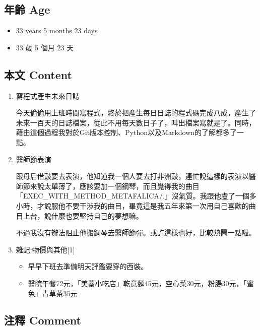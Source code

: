 \documentclass[a5paper, 12pt
]{book}
\providecommand{\tightlist}{%
  \setlength{\itemsep}{0pt}\setlength{\parskip}{0pt}}
\begin{document}
\hypertarget{ux5e74ux9f61-age-15}{%
\subsection{年齡 Age}\label{ux5e74ux9f61-age-15}}

\begin{itemize}
\tightlist
\item
  33 years 5 months 23 days
\item
  33 歲 5 個月 23 天
\end{itemize}

\hypertarget{ux672cux6587-content-15}{%
\subsection{本文 Content}\label{ux672cux6587-content-15}}

\begin{enumerate}
\def\labelenumi{\arabic{enumi}.}
\item
  寫程式產生未來日誌

  今天偷偷用上班時間寫程式，終於把產生每日日誌的程式碼完成八成，產生了未來一百天的日誌檔案，從此不用每天數日子了，叫出檔案寫就是了。同時，藉由這個過程我對於Git版本控制、Python以及Markdown的了解都多了一點。
\item
  醫師節表演

  跟母后借鼓要去表演，他知道我一個人要去打非洲鼓，連忙說這樣的表演以醫師節來說太單薄了，應該要加一個鋼琴，而且覺得我的曲目「EXEC\_WITH\_METHOD\_METAFALICA/.」沒氣質。我跟他盧了一個多小時，才說服他不要干涉我的曲目，畢竟這是我五年來第一次用自己喜歡的曲目上台，說什麼也要堅持自己的夢想嘛。

  不過我沒有辦法阻止他搬鋼琴去醫師節彈。或許這樣也好，比較熱鬧一點啦。
\item
  雜記:物價與其他{[}1{]}

  \begin{itemize}
  \tightlist
  \item
    早早下班去準備明天評鑑要穿的西裝。
  \item
    醫院午餐72元，「美蓁小吃店」乾意麵45元，空心菜30元，粉腸30元，「蜜兔」青草茶35元
  \end{itemize}
\end{enumerate}

\hypertarget{ux6ce8ux91cb-comment-11}{%
\subsection{注釋 Comment}\label{ux6ce8ux91cb-comment-11}}
\end{document}
